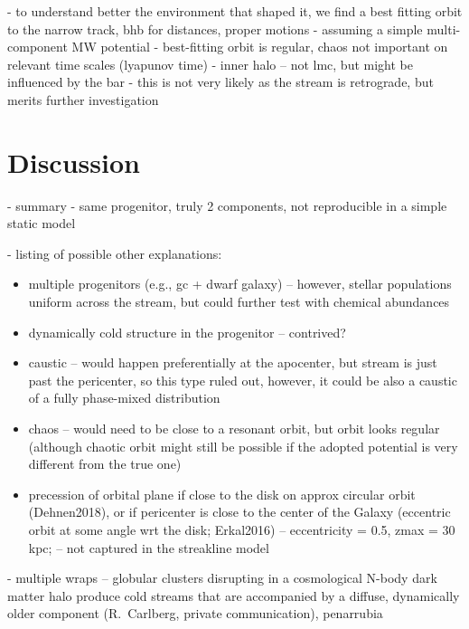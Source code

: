 \documentclass[twocolumn]{aastex62}
\begin{document}
- to understand better the environment that shaped it, we find a best fitting orbit to the narrow track, bhb for distances, proper motions
- assuming a simple multi-component MW potential
- best-fitting orbit is regular, chaos not important on relevant time scales (lyapunov time)
- inner halo -- not lmc, but might be influenced by the bar
- this is not very likely as the stream is retrograde, but merits further investigation


\section{Discussion}
\label{sec:discussion}
- summary
- same progenitor, truly 2 components, not reproducible in a simple static model

- listing of possible other explanations:
\begin{itemize}
 \item multiple progenitors (e.g., gc + dwarf galaxy) -- however, stellar populations uniform across the stream, but could further test with chemical abundances
 \item dynamically cold structure in the progenitor -- contrived?
 \item caustic -- would happen preferentially at the apocenter, but stream is just past the pericenter, so this type ruled out, however, it could be also a caustic of a fully phase-mixed distribution
 \item chaos -- would need to be close to a resonant orbit, but orbit looks regular (although chaotic orbit might still be possible if the adopted potential is very different from the true one)
 \item precession of orbital plane if close to the disk on approx circular orbit (Dehnen2018), or if pericenter is close to the center of the Galaxy (eccentric orbit at some angle wrt the disk; Erkal2016) -- eccentricity = 0.5, zmax = 30 kpc; -- not captured in the streakline model
\end{itemize}

- multiple wraps -- globular clusters disrupting in a cosmological N-body dark matter halo produce cold streams that are accompanied by a diffuse, dynamically older component (R.~Carlberg, private communication), penarrubia
\end{document}
